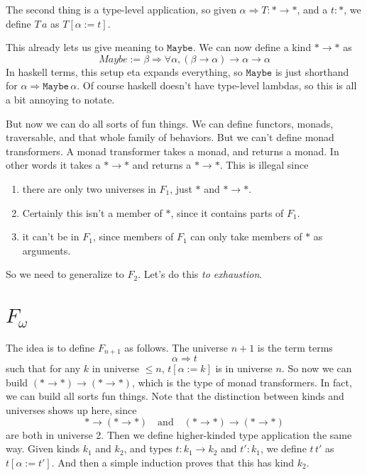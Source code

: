 \documentclass[12pt]{article}
\newcommand{\hask}{\texttt}
\begin{document}
The second thing is a type-level application, so given $\alpha \Rightarrow T : * \rightarrow *$, and a $t : *$, we define $T\, a$ as $T [\alpha := t]$. 

This already lets us give meaning to $\hask{Maybe}$.
We can now define a kind $* \rightarrow *$ as
\[
  Maybe := \beta \Rightarrow \forall \alpha, (\beta \rightarrow \alpha) \rightarrow \alpha \rightarrow \alpha
\]
In haskell terms, this setup eta expands everything, so $\hask{Maybe}$ is just shorthand for $\alpha \Rightarrow \hask{Maybe}\, \alpha$.
Of course haskell doesn't have type-level lambdas, so this is all a bit annoying to notate.

But now we can do all sorts of fun things.
We can define functors, monads, traversable, and that whole family of behaviors.
But we can't define monad transformers.
A monad transformer takes a monad, and returns a monad.
In other words it takes a $* \rightarrow *$ and returns a $* \rightarrow *$.
This is illegal since 
\begin{enumerate}
    \item there are only two universes in $F_1$, just $*$ and $* \rightarrow *$.
    \item Certainly this isn't a member of $*$, since it contains parts of $F_1$.
    \item it can't be in $F_1$, since members of $F_1$ can only take members of $*$ as arguments.
\end{enumerate}
So we need to generalize to $F_2$.
Let's do this \textit{to exhaustion}.

\section{$F_\omega$}
The idea is to define $F_{n+1}$ as follows. The universe $n+1$ is the term terms\[
  \alpha \Rightarrow t
\]
such that for any $k$ in universe $\leq n$, $t[\alpha := k]$ is in universe $n$.
So now we can build $(* \rightarrow *) \rightarrow (* \rightarrow *)$, which is the type of monad transformers.
In fact, we can build all sorts fun things. Note that the distinction between kinds and universes shows up here, since 
\[
  * \rightarrow (* \rightarrow *) \quad\text{and}\quad (* \rightarrow *) \rightarrow (* \rightarrow *)
\]
are both in universe 2. 
Then we define higher-kinded type application the same way. 
Given kinds $k_1$ and $k_2$, and types $t : k_1 \rightarrow k_2$ and $t' : k_1$, we define $t\, t'$ as $t[\alpha := t']$.
And then a simple induction proves that this has kind $k_2$.
\end{document}
